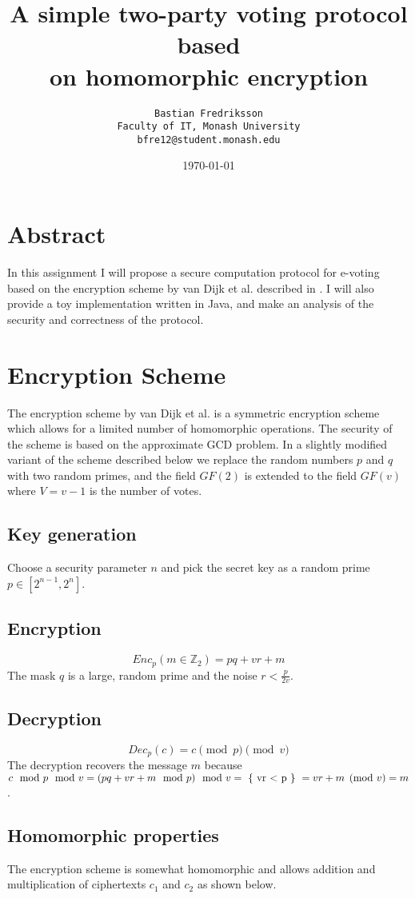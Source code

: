 \documentclass[10pt,twocolumn]{article}
\title{A simple two-party voting protocol based\\on homomorphic encryption}
\author{
        \texttt{Bastian Fredriksson}\\
                \texttt{Faculty of IT, Monash University}\\
        \texttt{bfre12@student.monash.edu}\\
}
\date{\today}
\begin{document}
\maketitle

\section{Abstract}
In this assignment I will propose a secure computation protocol for e-voting based on the encryption scheme by van Dijk et al. described in \cite{yi14}. I will also provide a toy implementation written in Java, and make an analysis of the security and correctness of the protocol.

\section{Encryption Scheme}
The encryption scheme by van Dijk et al. is a symmetric encryption scheme which allows for a limited number of homomorphic operations. The security of the scheme is based on the approximate GCD problem\cite{dijk10}. In a slightly modified variant of the scheme described below we replace the random numbers $p$ and $q$ with two random primes, and the field $GF(2)$ is extended to the field $GF(v)$ where $V=v-1$ is the number of votes.
\subsection{Key generation}
Choose a security parameter $n$ and pick the secret key as a random prime $p \in [2^{n-1}, 2^n]$.
\subsection{Encryption}
$$Enc_p(m \in \mathbb{Z}_2)=pq+vr+m$$
The mask $q$ is a large, random prime and the noise $r<\frac{p}{2v}$.
\subsection{Decryption}
$$Dec_p(c) = c \pmod{p} \pmod{v}$$
The decryption recovers the message $m$ because $c \mod p \mod v = (pq + vr + m \mod p) \mod v = \text{ \{ vr \textless ~p \} } = vr + m \pmod v = m$.
\subsection{Homomorphic properties}
The encryption scheme is somewhat homomorphic and allows addition and multiplication of ciphertexts $c_1$ and $c_2$ as shown below.
\end{document}
